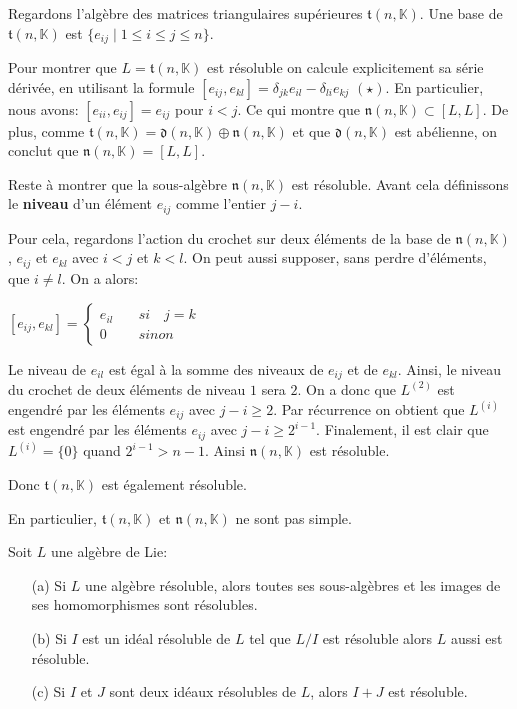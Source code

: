 \documentclass[a4paper,openany,12pt]{report}
\newcommand{\KK}{\mathbb{K}}
\newcommand{\ttt}{\mathfrak{t}}
\newcommand{\nn}{\mathfrak{n}}
\newcommand{\dd}{\mathfrak{d}}
\theoremstyle{break}
{\theorembodyfont{\upshape}
\newtheorem*{rmq}{Remarque :}
\newtheorem*{prv}{Preuve :}
\newtheorem*{ex}{Exemples :}
\newtheorem*{exe}{Exemple : }
\newtheorem*{nota}{Notation :}
\newtheorem*{dem}{D\'emonstration :}}
\begin{document}
\begin{exe}
\quad Regardons l'algèbre des matrices triangulaires supérieures $\ttt(n,\KK)$. Une base de $\ttt(n,\KK)$ est $\{ e_{ij} \mid 1\leq i \leq j\leq n \}$.

Pour montrer que $L = \ttt(n,\KK)$  est résoluble on calcule explicitement sa série dérivée, en utilisant la formule $ [ e_{ij},e_{kl} ]  = \delta_{jk}e_{il}  -  \delta_{li}e_{kj} $ $(\star)$. En particulier, nous avons:  $[ e_{ii},e_{ij} ]  = e_{ij}$ pour $i<j$. Ce qui montre que  $ \nn(n,\KK) \subset [L,L] $. De plus, comme $\ttt(n,\KK) = \dd(n,\KK) \oplus \nn(n,\KK)$ et que $\dd(n,\KK)$ est abélienne, on conclut que $ \nn(n,\KK) = [L,L]$.

Reste à montrer que la sous-algèbre $\nn(n,\KK)$ est résoluble. Avant cela définissons le \textbf{niveau} d'un élément $e_{ij}$ comme l'entier $j-i$.

Pour cela, regardons l'action du crochet sur deux éléments de la base de $\nn(n,\KK)$, $e_{ij}$ et $e_{kl}$ avec $i<j$ et $k<l$. On peut aussi supposer, sans perdre d'éléments, que $i \neq l$. On a alors:
\begin{center}
$[e_{ij},e_{kl}] = \left \{
\begin{aligned}
e_{il} &\quad si \quad j = k \\
0 &\quad sinon
\end{aligned}
\right. $
\end{center}
Le niveau de $e_{il}$ est égal à la somme des niveaux de $e_{ij}$ et de $e_{kl}$. Ainsi, le niveau du crochet de deux éléments de niveau $1$ sera $2$. On a donc que $L^{(2)}$ est engendré par les éléments $e_{ij}$ avec $j-i \geq 2$. Par récurrence on obtient que $L^{(i)}$ est engendré par les éléments $e_{ij}$ avec $j-i \geq 2^{i-1}$. Finalement, il est clair que $L^{(i)} = \{0\}$ quand $2^{i-1} > n-1$. Ainsi $\nn(n, \KK)$ est résoluble. 

Donc $\ttt(n, \KK)$ est également résoluble. 

En particulier, $\ttt(n, \KK)$ et $\nn(n,\KK)$ ne sont pas simple.
\end{exe}

\begin{prop}\label{prop:solv}
Soit $L$ une algèbre de Lie: 
\begin{itemize}
\item[(a)] Si $L$ une algèbre résoluble, alors toutes ses sous-algèbres et les images de ses homomorphismes sont résolubles.
\item[(b)] Si $I$ est un idéal résoluble de $L$ tel que $L/I$ est résoluble alors $L$ aussi est résoluble.
\item[(c)] Si $I$ et $J$ sont deux idéaux résolubles de $L$, alors $I+J$ est résoluble.
\end{itemize}
\end{prop}
\end{document}
